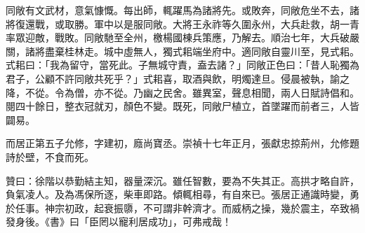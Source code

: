 \begin{pinyinscope}
同敞有文武材，意氣慷慨。每出師，輒躍馬為諸將先。或敗奔，同敞危坐不去，諸將復還戰，或取勝。軍中以是服同敞。大將王永祚等久圍永州，大兵赴救，胡一青率眾迎敵，戰敗。同敞馳至全州，檄楊國棟兵策應，乃解去。順治七年，大兵破嚴關，諸將盡棄桂林走。城中虛無人，獨式耜端坐府中。適同敞自靈川至，見式耜。式耜曰：「我為留守，當死此。子無城守責，盍去諸？」同敞正色曰：「昔人恥獨為君子，公顧不許同敞共死乎？」式耜喜，取酒與飲，明燭達旦。侵晨被執，諭之降，不從。令為僧，亦不從。乃幽之民舍。雖異室，聲息相聞，兩人日賦詩倡和。閱四十餘日，整衣冠就刃，顏色不變。既死，同敞尸植立，首墜躍而前者三，人皆闢易。

而居正第五子允修，字建初，廕尚寶丞。崇禎十七年正月，張獻忠掠荊州，允修題詩於壁，不食而死。

贊曰：徐階以恭勤結主知，器量深沉。雖任智數，要為不失其正。高拱才略自許，負氣凌人。及為馮保所逐，柴車即路。傾輒相尋，有自來已。張居正通識時變，勇於任事。神宗初政，起衰振隳，不可謂非幹濟才。而威柄之操，幾於震主，卒致禍發身後。《書》曰「臣罔以寵利居成功」，可弗戒哉！


\end{pinyinscope}